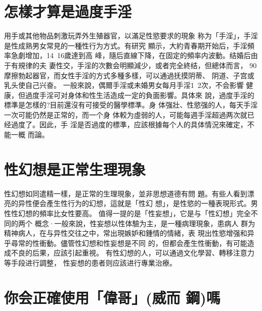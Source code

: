 \documentclass[12pt,UTF8]{ctexbook}
\begin{document}
\section{怎樣才算是過度手淫}

用手或其他物品刺激玩弄外生殖器官，以滿足性慾要求的現象
称为「手淫」，手淫是性成熟男女常見的一種性行为方式。有研究
顯示，大約青春期开始后，手淫頻率急劇增加，14~16歲達到高
峰，隨后直線下降，在固定的頻率内波動。结婚后由于有規律的夫
妻性交，手淫的次數会明顯減少，或者完全終结，但總体而言，
90%
摩擦勃起器官，而女性手淫的方式多種多樣，可以通過抚摸阴蒂、
阴道、子宫或乳头使自己兴奋。
一般來說，偶爾手淫或未婚男女每月手淫1~2次，不会影響
健康，但過度手淫可对身体和性生活造成一定的負面影響。具体來
說，過度手淫的標準是怎樣的?目前還沒有可接受的醫學標準。身
体强壯、性慾强的人，每天手淫一次可能仍然是正常的，而一个身
体較为虛弱的人，可能每週手淫超過两次就已经過度了。因此，手
淫是否過度的標準，应該根據每个人的具体情況來確定，不能一概
而論。
\section{性幻想是正常生理現象}
性幻想如同遣精一樣，是正常的生理現象，並非思想道德有問
題。有些人看到漂亮的异性便会產生性行为的幻想，這就是「性幻
想」，是性慾的一種表現形式。男性性幻想的頻率比女性要高。
值得一提的是「性妄想」，它是与「性幻想」完全不同的两个
概念·一般來說，性妄想以性体驗为主，是一種病理現象，患病人
群为精神病人，在与异性交往之中，常出現嫉妒和鍾情的情緒，表
現出性慾增强和异乎尋常的性衝動。儘管性幻想和性妄想是不同
的，但都会產生性衝動，有可能造成不良的后果，应該引起重視。
有性幻想的人，可以通過文化學習、轉移注意力等手段进行調整，
性妄想的患者则应該进行專業治療。

\section{你会正確使用「偉哥」(威而
鋼)嗎}
\end{document}
